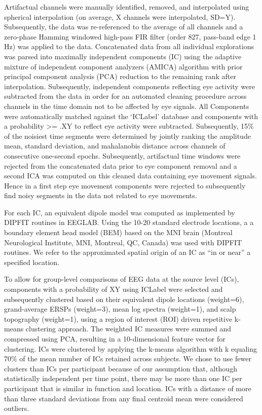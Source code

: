 Artifactual channels were manually identified, removed, and interpolated using spherical interpolation (on average, X channels were interpolated, SD=Y). Subsequently, the data was re-referenced to the average of all channels and a zero-phase Hamming windowed high-pass FIR filter (order 827, pass-band edge 1 Hz) was applied to the data. Concatenated data from all individual explorations was parsed into maximally independent components (IC) using the adaptive mixture of independent component analyzers (AMICA) algorithm with prior principal component analysis (PCA) reduction to the remaining rank after interpolation\citep{Palmer2011}. Subsequently, independent components reflecting eye activity were subtracted from the data in order for an automated cleaning procedure across channels in the time domain not to be affected by eye signals. All Components were automatically matched against the ‘ICLabel’ database and components with a probability >= .XY to reflect eye activity were subtracted\citep{iclabel}. Subsequently, 15\% of the noisiest time segments were determined by jointly ranking the amplitude mean, standard deviation, and mahalanobis distance across channels of consecutive one-second epochs\citep{cleaning_fh2018}. Subsequently, artifactual time windows were rejected from the concatenated data prior to eye component removal and a second ICA was computed on this cleaned data containing eye movement signals. Hence in a first step eye movement components were rejected to subsequently find noisy segments in the data not related to eye movements.

For each IC, an equivalent dipole model was computed as implemented by DIPFIT routines in EEGLAB. Using the 10-20 standard electrode locations, a a boundary element head model (BEM) based on the MNI brain (Montreal Neurological Institute, MNI, Montreal, QC, Canada) was used with DIPFIT routines. We refer to the approximated spatial origin of an IC as “in or near” a specified location.

To allow for group-level comparisons of EEG data at the source level (ICs), components with a probability of XY using ICLabel were selected and subsequently clustered based on their equivalent dipole locations (weight=6), grand-average ERSPs (weight=3), mean log spectra (weight=1), and scalp topography (weight=1), using a region of interest (ROI) driven repetitive k-means clustering approach\citep{cleaning_FH2018}. The weighted IC measures were summed and compressed using PCA, resulting in a 10-dimensional feature vector for clustering. ICs were clustered by applying the k-means algorithm with k equaling 70\% of the mean number of ICs retained across subjects. We chose to use fewer clusters than ICs per participant because of our assumption that, although statistically independent per time point, there may be more than one IC per participant that is similar in function and location. ICs with a distance of more than three standard deviations from any final centroid mean were considered outliers.

